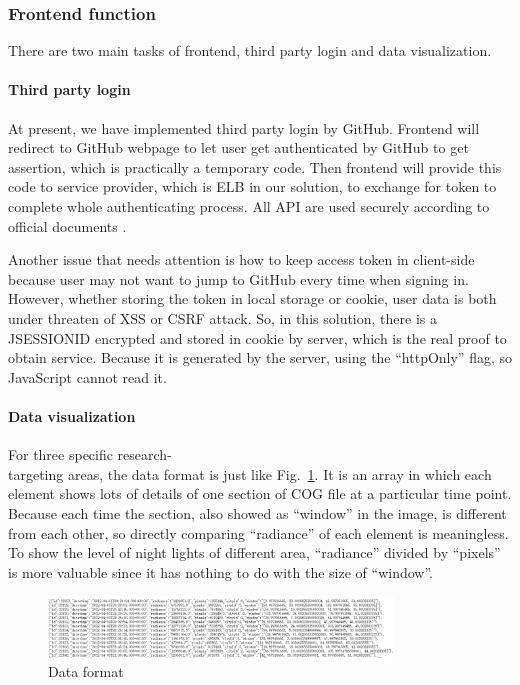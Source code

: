 \documentclass[conference]{IEEEtran}
\begin{document}
\subsubsection{Frontend function}

There are two main tasks of frontend, third party login and data visualization.

\paragraph{Third party login}

At present, we have implemented third party login by GitHub. Frontend will redirect to GitHub webpage to let user get authenticated 
by GitHub to get assertion, which is practically a temporary code. Then frontend will provide this code to service provider, which 
is ELB in our solution, to exchange for token to complete whole authenticating process. All API are used securely according to official 
documents \cite{Authoriz26:online}.

Another issue that needs attention is how to keep access token in client-side because user may not want to jump to GitHub every time when signing in. However, whether storing the token in local storage or cookie, user data is both under threaten of XSS or CSRF attack. So, in this solution, there is a JSESSIONID encrypted and stored in cookie by server, which is the real proof to obtain service. Because it is generated by the server, using the “httpOnly” flag, so JavaScript cannot read it.

\paragraph{Data visualization}

For three specific research-\\ targeting areas, the data format is just like Fig.~\ref{dffg}. It is an array in which 
each element shows lots of details of one section of COG file at a particular time point. Because each time the section, also showed 
as “window” in the image, is different from each other, so directly comparing “radiance” of each element is meaningless. To show the 
level of night lights of different area, “radiance” divided by “pixels” is more valuable since it has nothing to do with the size of 
“window”.

\begin{figure}[htbp]
    \centerline{\includegraphics[width=260pt]{images/Data_format_frontend_get.png}}
    \caption{Data format}
    \label{dffg}
\end{figure}
 
\end{document}
